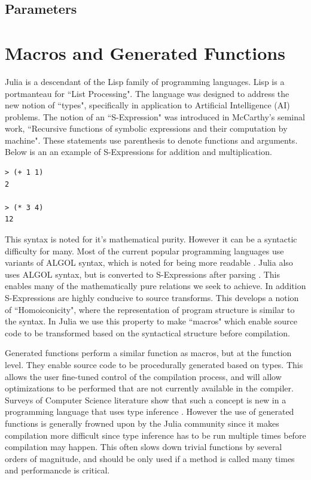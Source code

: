 \subsection{Parameters}



\section{Macros and Generated Functions}
Julia is a descendant of the Lisp family of programming languages. Lisp
is a portmanteau for ``List Processing". The language was designed to address
the new notion of ``types", specifically in application to Artificial
Intelligence (AI) problems\cite{McCarthy_1966}. The notion of an ``S-Expression"
was introduced in McCarthy's seminal work, ``Recursive functions of symbolic expressions and their
computation by machine". These statements use parenthesis
to denote functions and arguments. Below is an an example of S-Expressions
for addition and multiplication.

\begin{lstlisting}
> (+ 1 1)
2

> (* 3 4)
12
\end{lstlisting}

This syntax is noted for it's mathematical purity.
However it can be a syntactic difficulty for many.
Most of the current popular programming languages
use variants of ALGOL syntax, which is noted for being more readable
\cite{Hoare}.
Julia also uses ALGOL syntax, but is converted to S-Expressions after parsing
\cite{julia_internals}.
This enables
many of the mathematically pure relations we seek to achieve.
In addition S-Expressions are highly conducive to source transforms.
This develops a notion of ``Homoiconicity", where the representation of
program structure is similar to the syntax. In Julia we use this property
to make ``macros" which enable source code to be transformed based on
the syntactical structure before compilation.

Generated functions perform a similar function as macros, but at the function
level. They enable source code to be procedurally generated based on types.
This allows the user fine-tuned control of the compilation process, and
will allow optimizations to be performed that are not currently
available in the compiler.
Surveys of Computer Science literature show that such a concept is new in
a programming language that uses type inference
\cite{julia_metaprog}.
However the use of generated functions is generally frowned upon by the
Julia community since it makes compilation more difficult since type inference
has to be run multiple times before compilation may happen.
This often slows down trivial functions by
several orders of magnitude, and should be only used if a method is called
many times and performancde is critical.

